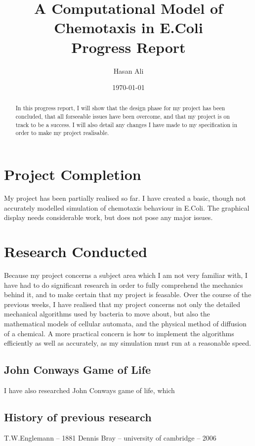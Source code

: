 \documentclass[a4paper,onecolumn,oneside]{article}
\begin{document}
\title{{\large A Computational Model of Chemotaxis in E.Coli} \\ [0.4cm] \textbf {Progress Report} }
\author{Hasan Ali}
\date{\today}
\maketitle

\begin{abstract}
In this progress report, I will show that the design phase for my project has been concluded,
that all forseeable issues have been overcome, and that my project is on track to be a success.
I will also detail any changes I have made to my specification in order to make my project realisable.
\end{abstract}

\section{Project Completion}
My project has been partially realised so far. I have created a basic, though not accurately modelled simulation of chemotaxis
behaviour in E.Coli. The graphical display needs considerable work, but does not pose any major issues.

\section{Research Conducted}
Because my project concerns a subject area which I am not very familiar with,  I have had to 
do significant research in order to fully comprehend the mechanics behind it, and to make certain that
my project is feasable. Over the course of the previous weeks, I have realised that my project concerns 
not only the detailed mechanical algorithms used by bacteria to move about, but also the mathematical models
of cellular automata, and the physical method of diffusion of a chemical. A more practical concern is
how to implement the algorithms efficiently as well as accurately, as my simulation must run at a reasonable
speed.

\subsection{John Conways Game of Life}
I have also researched John Conways game of life, which 
\subsection{History of previous research}
T.W.Englemann -- 1881
Dennis Bray -- university of cambridge -- 2006
\end{document}

